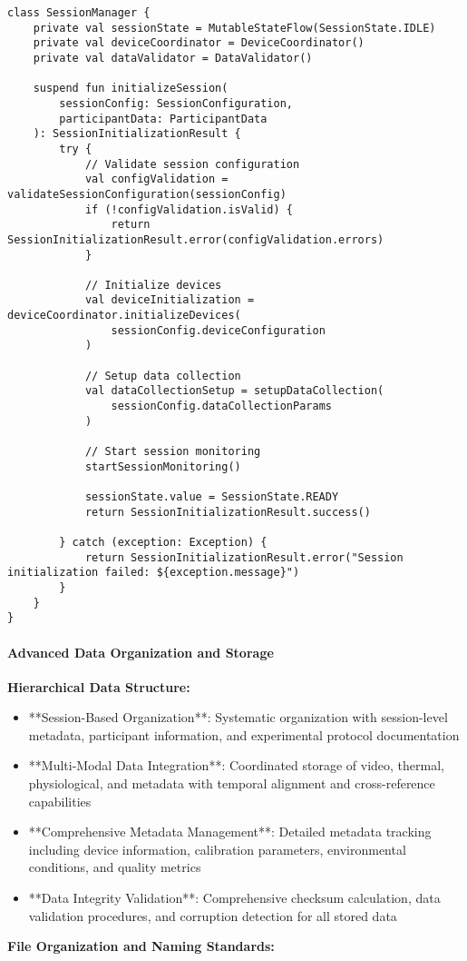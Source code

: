 \documentclass[12pt,a4paper]{report}
\begin{document}
\begin{verbatim}
class SessionManager {
    private val sessionState = MutableStateFlow(SessionState.IDLE)
    private val deviceCoordinator = DeviceCoordinator()
    private val dataValidator = DataValidator()

    suspend fun initializeSession(
        sessionConfig: SessionConfiguration,
        participantData: ParticipantData
    ): SessionInitializationResult {
        try {
            // Validate session configuration
            val configValidation = validateSessionConfiguration(sessionConfig)
            if (!configValidation.isValid) {
                return SessionInitializationResult.error(configValidation.errors)
            }

            // Initialize devices
            val deviceInitialization = deviceCoordinator.initializeDevices(
                sessionConfig.deviceConfiguration
            )

            // Setup data collection
            val dataCollectionSetup = setupDataCollection(
                sessionConfig.dataCollectionParams
            )

            // Start session monitoring
            startSessionMonitoring()

            sessionState.value = SessionState.READY
            return SessionInitializationResult.success()

        } catch (exception: Exception) {
            return SessionInitializationResult.error("Session initialization failed: ${exception.message}")
        }
    }
}
\end{verbatim}

\paragraph{Advanced Data Organization and Storage}

\textbf{Hierarchical Data Structure:}

\begin{itemize}
\item **Session-Based Organization**: Systematic organization with session-level metadata, participant information, and
  experimental protocol documentation
\item **Multi-Modal Data Integration**: Coordinated storage of video, thermal, physiological, and metadata with temporal
  alignment and cross-reference capabilities
\item **Comprehensive Metadata Management**: Detailed metadata tracking including device information, calibration
  parameters, environmental conditions, and quality metrics
\item **Data Integrity Validation**: Comprehensive checksum calculation, data validation procedures, and corruption
  detection for all stored data

\end{itemize}
\textbf{File Organization and Naming Standards:}
\end{document}
